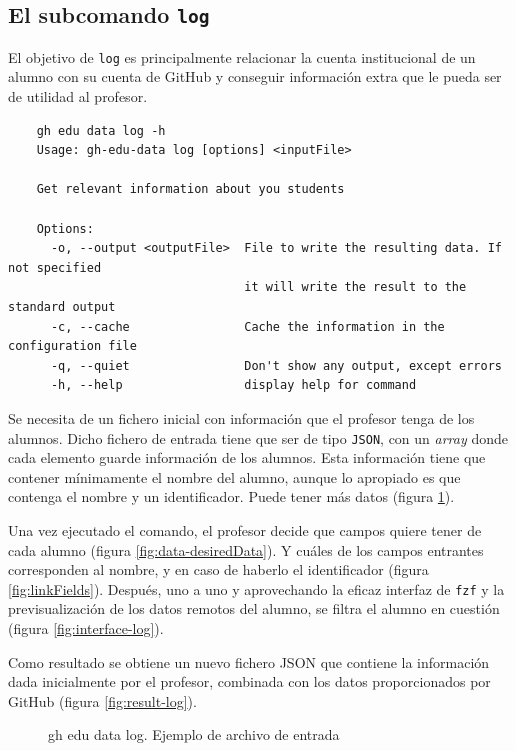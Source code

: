 \subsection{El subcomando {\tt log}}
El objetivo de \verb|log| es principalmente relacionar la cuenta institucional de un alumno con su cuenta de GitHub y conseguir información extra que le pueda ser de utilidad al profesor.

\begin{verbatim}
    gh edu data log -h
    Usage: gh-edu-data log [options] <inputFile>
    
    Get relevant information about you students
    
    Options:
      -o, --output <outputFile>  File to write the resulting data. If not specified
                                 it will write the result to the standard output
      -c, --cache                Cache the information in the configuration file
      -q, --quiet                Don't show any output, except errors
      -h, --help                 display help for command
\end{verbatim}
Se necesita de un fichero inicial con información que el profesor tenga de los alumnos. Dicho fichero de entrada tiene que ser de tipo \verb|JSON|, con un \emph{array} donde cada elemento guarde información de los alumnos. Esta información tiene que contener mínimamente el nombre del alumno, aunque lo apropiado es que contenga el nombre y un identificador. Puede tener más datos (figura \ref{fig:inputJSON}).

Una vez ejecutado el comando, el profesor decide que campos quiere tener de cada alumno (figura \ref{fig:data-desiredData}). Y cuáles de los campos entrantes corresponden al nombre, y en caso de haberlo el identificador (figura \ref{fig:linkFields}). Después, uno a uno y aprovechando la eficaz interfaz de \verb|fzf| y la previsualización de los datos remotos del alumno, se filtra el alumno en cuestión (figura \ref{fig:interface-log}).

Como resultado se obtiene un nuevo fichero JSON que contiene la información dada inicialmente por el profesor, combinada con los datos proporcionados por GitHub (figura \ref{fig:result-log}).

\begin{figure}[H]
    \centering
    \caption{gh edu data log. Ejemplo de archivo de entrada}
    \label{fig:inputJSON}
\end{figure}


